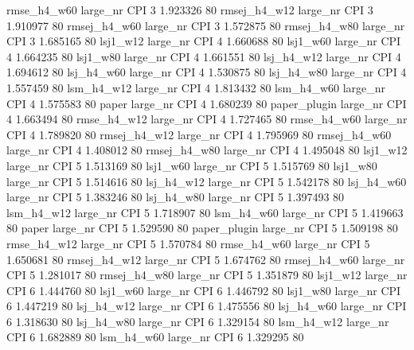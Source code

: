  rmse_h4_w60   large_nr      CPI                 3 1.923326 80
rmsej_h4_w12   large_nr      CPI                 3 1.910977 80
rmsej_h4_w60   large_nr      CPI                 3 1.572875 80
rmsej_h4_w80   large_nr      CPI                 3 1.685165 80
    lsj1_w12   large_nr      CPI                 4 1.660688 80
    lsj1_w60   large_nr      CPI                 4 1.664235 80
    lsj1_w80   large_nr      CPI                 4 1.661551 80
  lsj_h4_w12   large_nr      CPI                 4 1.694612 80
  lsj_h4_w60   large_nr      CPI                 4 1.530875 80
  lsj_h4_w80   large_nr      CPI                 4 1.557459 80
  lsm_h4_w12   large_nr      CPI                 4 1.813432 80
  lsm_h4_w60   large_nr      CPI                 4 1.575583 80
       paper   large_nr      CPI                 4 1.680239 80
paper_plugin   large_nr      CPI                 4 1.663494 80
 rmse_h4_w12   large_nr      CPI                 4 1.727465 80
 rmse_h4_w60   large_nr      CPI                 4 1.789820 80
rmsej_h4_w12   large_nr      CPI                 4 1.795969 80
rmsej_h4_w60   large_nr      CPI                 4 1.408012 80
rmsej_h4_w80   large_nr      CPI                 4 1.495048 80
    lsj1_w12   large_nr      CPI                 5 1.513169 80
    lsj1_w60   large_nr      CPI                 5 1.515769 80
    lsj1_w80   large_nr      CPI                 5 1.514616 80
  lsj_h4_w12   large_nr      CPI                 5 1.542178 80
  lsj_h4_w60   large_nr      CPI                 5 1.383246 80
  lsj_h4_w80   large_nr      CPI                 5 1.397493 80
  lsm_h4_w12   large_nr      CPI                 5 1.718907 80
  lsm_h4_w60   large_nr      CPI                 5 1.419663 80
       paper   large_nr      CPI                 5 1.529590 80
paper_plugin   large_nr      CPI                 5 1.509198 80
 rmse_h4_w12   large_nr      CPI                 5 1.570784 80
 rmse_h4_w60   large_nr      CPI                 5 1.650681 80
rmsej_h4_w12   large_nr      CPI                 5 1.674762 80
rmsej_h4_w60   large_nr      CPI                 5 1.281017 80
rmsej_h4_w80   large_nr      CPI                 5 1.351879 80
    lsj1_w12   large_nr      CPI                 6 1.444760 80
    lsj1_w60   large_nr      CPI                 6 1.446792 80
    lsj1_w80   large_nr      CPI                 6 1.447219 80
  lsj_h4_w12   large_nr      CPI                 6 1.475556 80
  lsj_h4_w60   large_nr      CPI                 6 1.318630 80
  lsj_h4_w80   large_nr      CPI                 6 1.329154 80
  lsm_h4_w12   large_nr      CPI                 6 1.682889 80
  lsm_h4_w60   large_nr      CPI                 6 1.329295 80
